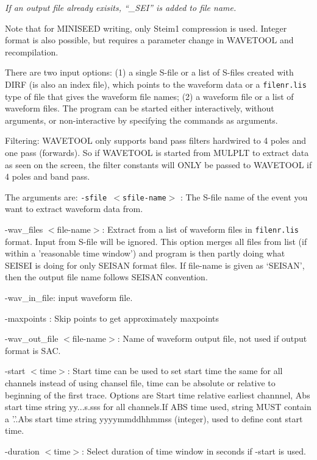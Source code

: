 \textit{If an output file already exisits, ``\_SEI'' is added to file name.}

Note that for MINISEED writing, only Steim1 compression is used. Integer format is also possible, but requires a parameter change in WAVETOOL and recompilation. 

There are two input options: (1) a single S-file or a list of S-files created with DIRF (is also an index file), which points to the waveform data or a \texttt{filenr.lis} type of file that gives the waveform file names; 
(2) a waveform file or a list of waveform files. The program can be started either interactively, without arguments, or non-interactive by specifying the commands as arguments. 


Filtering: WAVETOOL only supports band pass filters hardwired to 4 poles and one pass (forwards). So if WAVETOOL is started from MULPLT to extract data as seen on the screen, the filter constants will ONLY be passed to WAVETOOL if 4 poles and band pass.

The arguments are: \texttt{-sfile $<$sfile-name$>$} : The S-file name of the event you want to extract waveform data from. 

-wav\_files $<$file-name$>$: Extract from a list of waveform files in \texttt{filenr.lis} format. Input from S-file will be ignored. This option merges all files from list (if within a 'reasonable time window') and program is then partly doing what SEISEI is doing for only SEISAN format files. If file-name is given as `SEISAN', then the output file name follows SEISAN convention. 

-wav\_in\_file: input waveform file.

-maxpoints : Skip points to get approximately maxpoints 

-wav\_out\_file $<$file-name$>$: Name of waveform output file, not used if output format is SAC. 

-start $<$time$>$: Start time can be used to set start time the same for all channels instead of using 
chansel file, time can be absolute or relative to beginning of the first trace. Options are 
Start time relative earliest channnel, 
       Abs start time string yy...s.sss for all channels.If ABS time used, string MUST contain a '.'.Abs 
start time string yyyymmddhhmmss (integer), used to define cont start time. 

-duration $<$time$>$: Select duration of time window in seconds if -start is used. 

